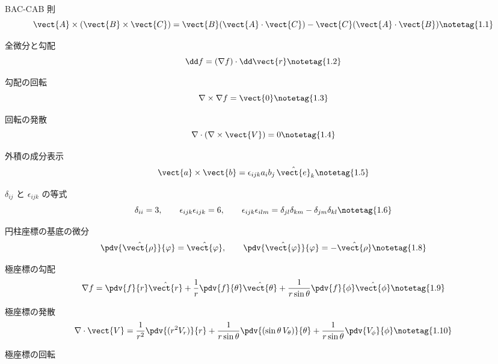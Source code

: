 \documentclass[uplatex,dvipdfmx,a4paper,11pt]{jsarticle}
\begin{document}
\begin{kirokuichiran}
\end{kirokuichiran}

\youtenseiri
\begin{noteshikilist}
  \item BAC-CAB 則 %
    \[ \vect{A}\times(\vect{B}\times\vect{C}) = \vect{B}(\vect{A}\cdot\vect{C}) - \vect{C}(\vect{A}\cdot\vect{B}) \notetag{1.1} \]
  \item 全微分と勾配 %
    \[ \dd f = (\nabla f)\cdot\dd\vect{r} \notetag{1.2} \]
  \item 勾配の回転 %
    \[ \nabla\times\nabla f = \vect{0} \notetag{1.3} \]
  \item 回転の発散 %
    \[ \nabla\cdot(\nabla\times\vect{V}) = 0 \notetag{1.4} \]
  \item 外積の成分表示 %
    \[ \vect{a}\times\vect{b} = \epsilon_{ijk}a_ib_j\,\hat{\vect{e}}_k \notetag{1.5} \]
  \item $\delta_{ij}$ と $\epsilon_{ijk}$ の等式 %
    \[ \delta_{ii} = 3, \qquad \epsilon_{ijk}\epsilon_{ijk} = 6, \qquad \epsilon_{ijk}\epsilon_{ilm} = \delta_{jl}\delta_{km} - \delta_{jm}\delta_{kl} \notetag{1.6} \]
  \item 円柱座標の基底の微分 %
    \[ \pdv{\hat{\vect{\rho}}}{\varphi} = \hat{\vect{\varphi}}, \qquad \pdv{\hat{\vect{\varphi}}}{\varphi} = -\hat{\vect{\rho}} \notetag{1.8} \]
  \item 極座標の勾配 %
    \[ \nabla f = \pdv{f}{r}\hat{\vect{r}} + \frac{1}{r}\pdv{f}{\theta}\hat{\vect{\theta}} + \frac{1}{r\sin\theta}\pdv{f}{\phi}\hat{\vect{\phi}} \notetag{1.9} \]
  \item 極座標の発散 %
    \[ \nabla\cdot\vect{V} = \frac{1}{r^2}\pdv{(r^2V_r)}{r} + \frac{1}{r\sin\theta}\pdv{(\sin\theta\,V_\theta)}{\theta} + \frac{1}{r\sin\theta}\pdv{V_\phi}{\phi} \notetag{1.10} \]
  \item 極座標の回転 %

\end{noteshikilist}
\end{document}

